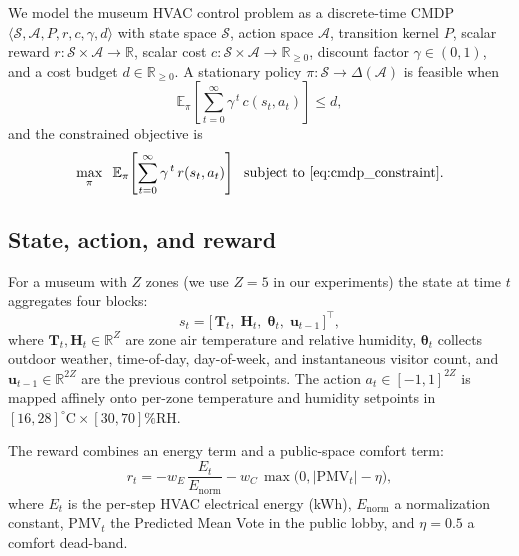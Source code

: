 We model the museum HVAC control problem as a discrete-time CMDP
$\langle\mathcal{S},\mathcal{A},P,r,c,\gamma,d\rangle$ with state space
$\mathcal{S}$, action space $\mathcal{A}$, transition kernel $P$, scalar
reward $r:\mathcal{S}\times\mathcal{A}\to\mathbb{R}$, scalar cost
$c:\mathcal{S}\times\mathcal{A}\to\mathbb{R}_{\ge 0}$, discount factor
$\gamma\in(0,1)$, and a cost budget $d\in\mathbb{R}_{\ge 0}$. A
stationary policy $\pi:\mathcal{S}\to\Delta(\mathcal{A})$ is feasible
when
\begin{equation}
\mathbb{E}_{\pi}\!\left[\sum_{t=0}^\infty \gamma^{\,t}\, c(s_t,a_t)\right]
\le d,
\label{eq:cmdp_constraint}
\end{equation}
and the constrained objective is
\begin{equation}
\max_{\pi}\;\;\mathbb{E}_{\pi}\!\left[\sum_{t=0}^\infty \gamma^{\,t}\, r(s_t,a_t)\right]
\;\text{ subject to \eqref{eq:cmdp_constraint}.}
\label{eq:cmdp_objective}
\end{equation}

\subsection{State, action, and reward}\label{sec:state_action_reward}

For a museum with $Z$ zones (we use $Z=5$ in our experiments) the state
at time $t$ aggregates four blocks:
\begin{equation}
s_t = \big[\,\mathbf{T}_t,\;\mathbf{H}_t,\;\boldsymbol{\theta}_t,\;
            \boldsymbol{u}_{t-1}\,\big]^{\top},
\label{eq:state}
\end{equation}
where $\mathbf{T}_t,\mathbf{H}_t\in\mathbb{R}^{Z}$ are zone air
temperature and relative humidity, $\boldsymbol{\theta}_t$ collects
outdoor weather, time-of-day, day-of-week, and instantaneous visitor
count, and $\boldsymbol{u}_{t-1}\in\mathbb{R}^{2Z}$ are the previous
control setpoints. The action $a_t\in[-1,1]^{2Z}$ is mapped affinely
onto per-zone temperature and humidity setpoints in
$[16,28]^\circ\mathrm{C}\times[30,70]\%\mathrm{RH}$.

The reward combines an energy term and a public-space comfort term:
\begin{equation}
r_t = -w_E\,\frac{E_t}{E_{\mathrm{norm}}} - w_C\,\max\big(0,|\mathrm{PMV}_t|-\eta\big),
\label{eq:reward}
\end{equation}
where $E_t$ is the per-step HVAC electrical energy (kWh),
$E_{\mathrm{norm}}$ a normalization constant, $\mathrm{PMV}_t$ the
Predicted Mean Vote in the public lobby, and $\eta=0.5$ a comfort
dead-band.

